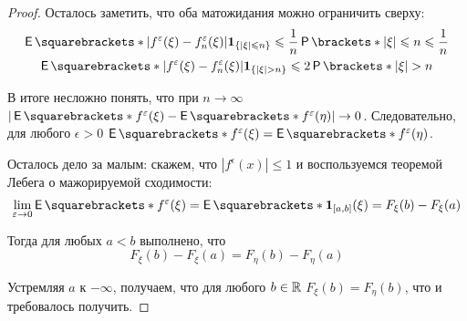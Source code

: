 \begin{proof}
	Осталось заметить, что оба матожидания можно ограничить сверху:
	\begin{gather*}
		\E{|f^{\epsilon}(\xi) - f_{n}^{\epsilon}(\xi)| \mathbf{1}_{\{|\xi| \leq 
		n\}}} \leq \frac{1}{n}\Pr{|\xi| \leq n} \leq \frac{1}{n}\\
		\E{|f^{\epsilon}(\xi) - f_{n}^{\epsilon}(\xi)| \mathbf{1}_{\{|\xi| > 
		n\}}} \leq 2\Pr{|\xi| > n}
	\end{gather*}

	В итоге несложно понять, что при \(n \to \infty\) \(|\E{f^{\epsilon}(\xi)} 
	- \E{f^{\epsilon}(\eta)}| \to 0\). Следовательно, для любого \(\epsilon > 
	0\) \(\E{f^{\epsilon}(\xi)} = \E{f^{\epsilon}(\eta)}\). 
	
	Осталось дело за малым: скажем, что \(|f^{\epsilon}(x)| \leq 1\) и 
	воспользуемся теоремой Лебега о мажорируемой сходимости:
	\[
		\lim\limits_{\epsilon \to 0} \E{f^{\epsilon}(\xi)} = \E{\mathbf{1}_{[a, 
		b]}(\xi)} = F_{\xi}(b) - F_{\xi}(a)
	\]
	
	Тогда для любых \(a < b\) выполнено, что
	\[
		F_{\xi}(b) - F_{\xi}(a) = F_{\eta}(b) - F_{\eta}(a)
	\]
	
	Устремляя \(a\) к \(-\infty\), получаем, что для любого \(b \in \mathbb{R}\) 
	\(F_{\xi}(b) = F_{\eta}(b)\), что и требовалось получить.
\end{proof}


